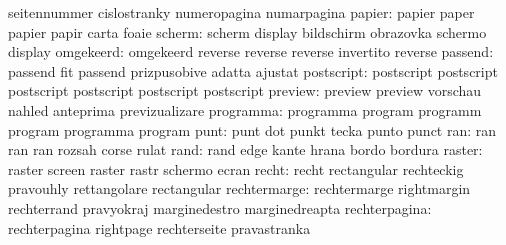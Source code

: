                            seitennummer              cislostranky
                           numeropagina              numarpagina
                   papier: papier                    paper
                           papier                    papir
                           carta                     foaie
                   scherm: scherm                    display
                           bildschirm                obrazovka
                           schermo                   display %
                omgekeerd: omgekeerd                 reverse 
                           reverse                   reverse 
                           invertito                 reverse %
                  passend: passend                   fit
                           passend                   prizpusobive
                           adatta                    ajustat
               postscript: postscript                postscript
                           postscript                postscript
                           postscript                postscript
                  preview: preview                   preview
                           vorschau                  nahled
                           anteprima                 previzualizare
                programma: programma                 program
                           programm                  program
                           programma                 program
                     punt: punt                      dot
                           punkt                     tecka
                           punto                     punct
                      ran: ran                       ran
                           ran                       rozsah
                           corse                     rulat
                     rand: rand                      edge
                           kante                     hrana
                           bordo                     bordura
                   raster: raster                    screen
                           raster                    rastr
                           schermo                   ecran
                    recht: recht                     rectangular
                           rechteckig                pravouhly
                           rettangolare              rectangular
             rechtermarge: rechtermarge              rightmargin
                           rechterrand               pravyokraj
                           marginedestro             marginedreapta
            rechterpagina: rechterpagina             rightpage
                           rechterseite              pravastranka
